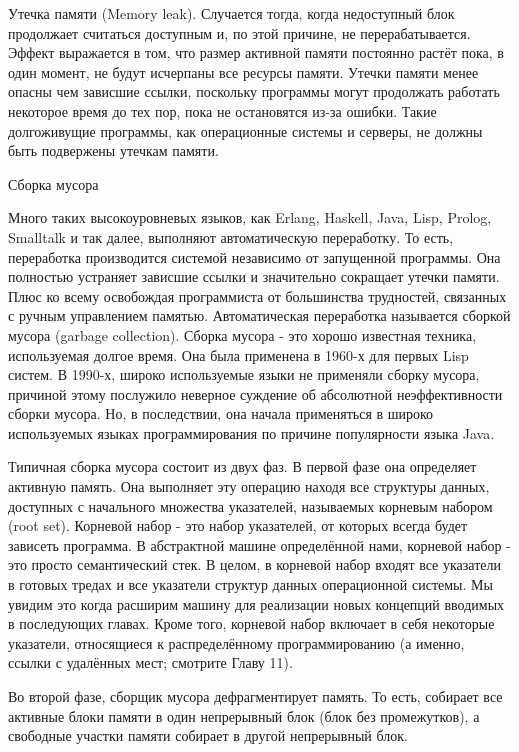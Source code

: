 Утечка памяти (Memory leak). Случается тогда, когда недоступный блок продолжает считаться доступным и, по этой причине, не перерабатывается. Эффект выражается в том, что размер активной памяти постоянно растёт пока, в один момент, не будут исчерпаны все ресурсы памяти. Утечки памяти менее опасны чем зависшие ссылки, поскольку программы могут продолжать работать некоторое время до тех пор, пока не остановятся из-за ошибки. Такие долгоживущие программы, как операционные системы и серверы, не должны быть подвержены утечкам памяти.

Сборка мусора

Много таких высокоуровневых языков, как Erlang, Haskell, Java, Lisp, Prolog, Smalltalk и так далее, выполняют автоматическую переработку. То есть, переработка производится системой независимо от запущенной программы. Она полностью устраняет зависшие ссылки и значительно сокращает утечки памяти. Плюс ко всему освобождая программиста от большинства трудностей, связанных с ручным управлением памятью. Автоматическая переработка называется сборкой мусора (garbage collection). Сборка мусора - это хорошо известная техника, используемая долгое время. Она была применена в 1960-х для первых Lisp систем. В 1990-х, широко используемые языки не применяли сборку мусора, причиной этому послужило неверное суждение об абсолютной неэффективности сборки мусора. Но, в последствии, она начала применяться в широко используемых языках программирования по причине популярности языка Java.

Типичная сборка мусора состоит из двух фаз. В первой фазе она определяет активную память. Она выполняет эту операцию находя все структуры данных, доступных с начального множества указателей, называемых корневым набором (root set). Корневой набор - это набор указателей, от которых всегда будет зависеть программа. В абстрактной машине определённой нами, корневой набор - это просто семантический стек. В целом, в корневой набор входят все указатели в готовых тредах и все указатели структур данных операционной системы. Мы увидим это когда расширим машину для реализации новых концепций вводимых в последующих главах. Кроме того, корневой набор включает в себя некоторые указатели, относящиеся к распределённому программированию (а именно, ссылки с удалённых мест; смотрите Главу 11).

Во второй фазе, сборщик мусора дефрагментирует память. То есть, собирает все активные блоки памяти в один непрерывный блок (блок без промежутков), а свободные участки памяти собирает в другой непрерывный блок.

